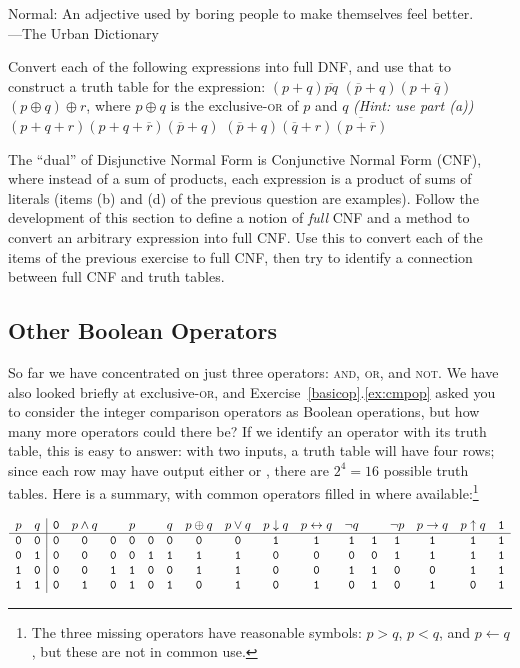 \begin{tailquote}
Normal: An adjective used by boring people to make themselves feel better.\\
\hfill---The Urban Dictionary
\end{tailquote}

\begin{exercises}
\problem Convert each of the following expressions into full DNF, and use that to construct a truth table for the expression:
\ppart $(p+q)\overline{pq}$
\ppart $(\overline{p}+q)(p+\overline{q})$
\ppart $(p\oplus q)\oplus r$, where $p\oplus q$ is the exclusive-\textsc{or} of $p$ and $q$ \textit{(Hint: use part (a))}
\ppart $(p+q+r)(p+q+\overline{r})(\overline{p}+q)$
\ppart $(\overline{p}+q)(\overline{q}+r)\overline{(p+\overline{r})}$

\problem\label{ex:CNF}The ``dual'' of Disjunctive Normal Form is Conjunctive Normal Form (CNF), where instead of a sum of products, each expression is a product of sums of literals (items (b) and (d) of the previous question are examples). Follow the development of this section to define a notion of \textit{full} CNF and a method to convert an arbitrary expression into full CNF. Use this to convert each of the items of the previous exercise to full CNF, then try to identify a connection between full CNF and truth tables.

\end{exercises}

\subsection{Other Boolean Operators}\label{ssec:OtherBooleanOps}
So far we have concentrated on just three operators: \textsc{and}, \textsc{or}, and \textsc{not}. We have also looked briefly at exclusive-\textsc{or}, and Exercise~\ref{basicop}.\ref{ex:cmpop} asked you to consider the integer comparison operators as Boolean operations, but how many more operators could there be? If we identify an operator with its truth table, this is easy to answer: with two inputs, a truth table will have four rows; since each row may have output either \0 or \1, there are $2^4=16$ possible truth tables. Here is a summary, with common operators filled in where available:\footnote{The three missing operators have reasonable symbols: $p>q$, $p<q$, and $p\leftarrow q$, but these are not in common use.}

\[ \begin{array}{cc|cccccccccccccccc}
p & q & \mathtt{0} & p\land q & & p & & q & p\oplus q & p\lor q & p\downarrow q & p\leftrightarrow q &
\lnot q & & \lnot p & p\rightarrow q & p\uparrow q & \mathtt{1}\\ \hline
\mathtt{0} & \mathtt{0} & \mathtt{0} & \mathtt{0} & \mathtt{0} & \mathtt{0} & \mathtt{0} & \mathtt{0} & \mathtt{0} & \mathtt{0} & \mathtt{1} & \mathtt{1} & \mathtt{1} & \mathtt{1} & \mathtt{1} & \mathtt{1} & \mathtt{1} & \mathtt{1}\\
\mathtt{0} & \mathtt{1} & \mathtt{0} & \mathtt{0} & \mathtt{0} & \mathtt{0} & \mathtt{1} & \mathtt{1} & \mathtt{1} & \mathtt{1} & \mathtt{0} & \mathtt{0} & \mathtt{0} & \mathtt{0} & \mathtt{1} & \mathtt{1} & \mathtt{1} & \mathtt{1}\\
\mathtt{1} & \mathtt{0} & \mathtt{0} & \mathtt{0} & \mathtt{1} & \mathtt{1} & \mathtt{0} & \mathtt{0} & \mathtt{1} & \mathtt{1} & \mathtt{0} & \mathtt{0} & \mathtt{1} & \mathtt{1} & \mathtt{0} & \mathtt{0} & \mathtt{1} & \mathtt{1}\\
\mathtt{1} & \mathtt{1} & \mathtt{0} & \mathtt{1} & \mathtt{0} & \mathtt{1} & \mathtt{0} & \mathtt{1} & \mathtt{0} & \mathtt{1} & \mathtt{0} & \mathtt{1} & \mathtt{0} & \mathtt{1} & \mathtt{0} & \mathtt{1} & \mathtt{0} & \mathtt{1}
\end{array} \]

